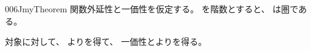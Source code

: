 \documentclass[index]{subfiles}
\begin{document}
\begin{myBlock}{006J}{myTheorem}
  関数外延性と一価性を仮定する。
  を階数とすると、
  は圏である。
\end{myBlock}
\begin{myProof}
  対象に対して、
  よりを得て、
  一価性とよりを得る。
\end{myProof}
\end{document}
